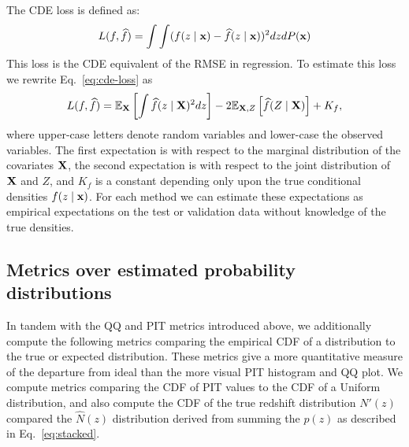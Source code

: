 
The CDE loss is defined as:
\begin{equation} \label{eq:cde-loss}
L(f, \widehat{f}) = \int \int (f(z \mid {\mathbf{x}}) - \widehat{f}(z \mid {\mathbf{x}}))^{2} dz dP({\mathbf{x}})
\end{equation}
This loss is the CDE equivalent of the RMSE in regression. To estimate this loss we rewrite Eq.~\ref{eq:cde-loss} as
\begin{equation} \label{eq:estimated-cde-loss}
L(f, \widehat{f}) = \mathbb{E}_{\mathbf{X}} \left[\int \widehat{f}(z \mid {\mathbf{X}})^{2} dz\right] - 2 \mathbb{E}_{{\mathbf{X}},Z}\left[\widehat{f}(Z \mid {\mathbf{X}})\right] + K_{f},
\end{equation}
where upper-case letters denote random variables and lower-case the observed variables.  The first expectation is with respect to the marginal distribution of the covariates ${\mathbf{X}}$, the second expectation is with respect to the joint distribution of ${\mathbf{X}}$ and $Z$, and $K_{f}$ is a constant depending only upon the true conditional densities $f(z\mid {\mathbf{x}})$.
For each method we can estimate these expectations as empirical expectations on the test or validation data \citep[Eq.~7 in][]{Izbicki:17b} without knowledge of the true densities.


\subsection{Metrics over estimated probability distributions}
\label{sec:quantmet}

In tandem with the QQ and PIT metrics introduced above, we additionally compute the following metrics comparing the empirical CDF of a distribution to the true or expected distribution.  These metrics give a more quantitative measure of the departure from ideal than the more visual PIT histogram and QQ plot.  We compute metrics comparing the CDF of PIT values to the CDF of a Uniform distribution, and also compute the CDF of the true redshift distribution $N'(z)$ compared the $\hat{N}(z)$ distribution derived from summing the $p(z)$ as described in Eq.~\ref{eq:stacked}.

